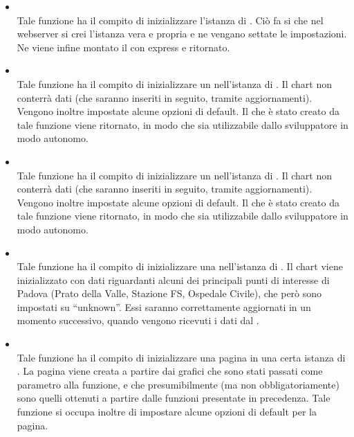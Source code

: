         \begin{itemize}

            \item {} \\
            Tale funzione ha il compito di inizializzare l'istanza di . Ciò fa si che nel webserver si crei l'istanza vera e propria e ne vengano settate le impostazioni. Ne viene infine montato il  con express e ritornato.
            
            \item {} \\
            Tale funzione ha il compito di inizializzare un  nell'istanza di . Il chart non conterrà dati (che saranno inseriti in seguito, tramite aggiornamenti). Vengono inoltre impostate alcune opzioni di default. Il  che è stato creato da tale funzione viene ritornato, in modo che sia utilizzabile dallo sviluppatore in modo autonomo.
            
            \item {} \\
            Tale funzione ha il compito di inizializzare un  nell'istanza di . Il chart non conterrà dati (che saranno inseriti in seguito, tramite aggiornamenti). Vengono inoltre impostate alcune opzioni di default. Il  che è stato creato da tale funzione viene ritornato, in modo che sia utilizzabile dallo sviluppatore in modo autonomo.
            
            \item {} \\
            Tale funzione ha il compito di inizializzare una  nell'istanza di . Il chart viene inizializzato con dati riguardanti alcuni dei principali punti di interesse di Padova (Prato della Valle, Stazione FS, Ospedale Civile), che però sono impostati su “unknown”. Essi saranno correttamente aggiornati in un momento successivo, quando vengono ricevuti i dati dal  .
            
            \item {} \\
            Tale funzione ha il compito di inizializzare una pagina in una certa istanza di . La pagina viene creata a partire dai grafici che sono stati passati come parametro alla funzione, e che presumibilmente (ma non obbligatoriamente) sono quelli ottenuti a partire dalle funzioni presentate in precedenza. Tale funzione si occupa inoltre di impostare alcune opzioni di default per la pagina.
            

\end{itemize}

